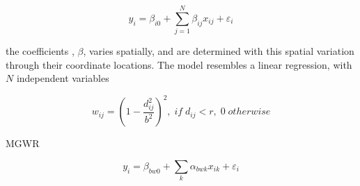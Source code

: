 \begin{equation}
    y_{i} = \beta_{i0} + \sum^{N}_{j=1}\beta_{ij}x_{ij} + \varepsilon_{i}
\end{equation}

the coefficients , $\beta$, varies spatially, and are determined with this spatial variation through their coordinate locations. 
The model resembles a linear regression, with $N$ independent variables 

\begin{equation}
    w_{ij} =\left (1 - \frac{d_{ij}^2}{b^{2}}  \right )^{2},\; if \; d_{ij} < r, \; 0 \; otherwise
\end{equation}

MGWR

\begin{equation}
y_{i} = \beta_{bw0} + \sum_{k} \alpha_{bwk} x_{ik} + \varepsilon_{i}
\end{equation}

